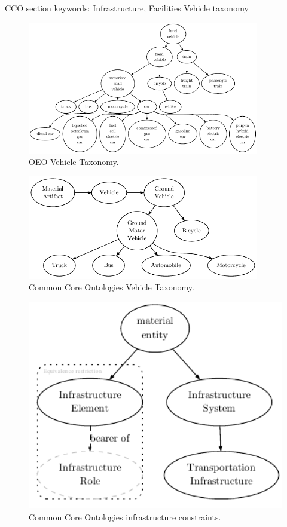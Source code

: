 CCO section keywords: Infrastructure, Facilities Vehicle taxonomy

\begin{figure}[h]\label{landvehicletaxoeo}
    \caption{OEO Vehicle Taxonomy.}
    \centering
    \includegraphics[width=0.9\textwidth]{images/OEOLVehicles}
\end{figure}

\begin{figure}[h]
    \caption{Common Core Ontologies Vehicle Taxonomy.}
    \centering
    \includegraphics[width=0.9\textwidth]{images/CCOVehicles}
\end{figure}


\begin{figure}[h]
    \caption{Common Core Ontologies infrastructure constraints.}
    \centering
    \includegraphics[width=1.0\textwidth]{images/infrastructureSystem}
\end{figure}



